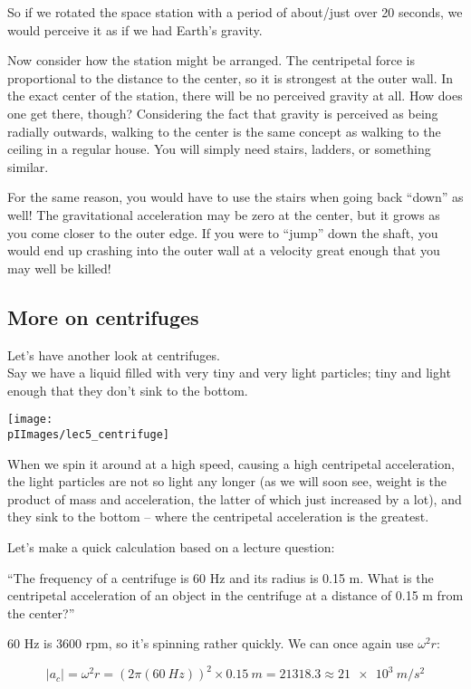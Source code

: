 So if we rotated the space station with a period of about/just over 20 seconds, we would perceive it as if we had Earth's gravity.

Now consider how the station might be arranged. The centripetal force is proportional to the distance to the center, so it is strongest at the outer wall. In the exact center of the station, there will be no perceived gravity at all. How does one get there, though? Considering the fact that gravity is perceived as being radially outwards, walking to the center is the same concept as walking to the ceiling in a regular house. You will simply need stairs, ladders, or something similar.

For the same reason, you would have to use the stairs when going back ``down'' as well! The gravitational acceleration may be zero at the center, but it grows as you come closer to the outer edge. If you were to ``jump'' down the shaft, you would end up crashing into the outer wall at a velocity great enough that you may well be killed!

\subsection{More on centrifuges}

Let's have another look at centrifuges.\\
Say we have a liquid filled with very tiny and very light particles; tiny and light enough that they don't sink to the bottom.

\begin{center}
\texttt{[image: \\pIImages/lec5\_centrifuge]}
\end{center}

When we spin it around at a high speed, causing a high centripetal acceleration, the light particles are not so light any longer (as we will soon see, weight is the product of mass and acceleration, the latter of which just increased by a lot), and they sink to the bottom -- where the centripetal acceleration is the greatest.

Let's make a quick calculation based on a lecture question:

``The frequency of a centrifuge is 60 Hz and its radius is 0.15 m. What is the centripetal acceleration of an object in the centrifuge at a distance of 0.15 m from the center?''

60 Hz is 3600 rpm, so it's spinning rather quickly. We can once again use $\omega^2 r$:

\begin{equation}
|a_c| = \omega^2 r = (2 \pi (\SI{60}{Hz}))^2 \times \SI{0.15}{m} = 21318.3 \approx \SI{21e3}{m/s^2}
\end{equation}

